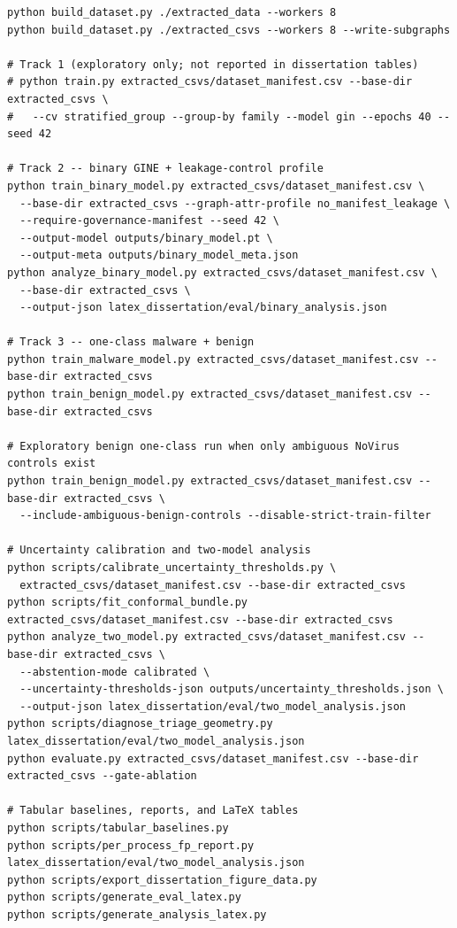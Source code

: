\begin{lstlisting}
python build_dataset.py ./extracted_data --workers 8
python build_dataset.py ./extracted_csvs --workers 8 --write-subgraphs

# Track 1 (exploratory only; not reported in dissertation tables)
# python train.py extracted_csvs/dataset_manifest.csv --base-dir extracted_csvs \
#   --cv stratified_group --group-by family --model gin --epochs 40 --seed 42

# Track 2 -- binary GINE + leakage-control profile
python train_binary_model.py extracted_csvs/dataset_manifest.csv \
  --base-dir extracted_csvs --graph-attr-profile no_manifest_leakage \
  --require-governance-manifest --seed 42 \
  --output-model outputs/binary_model.pt \
  --output-meta outputs/binary_model_meta.json
python analyze_binary_model.py extracted_csvs/dataset_manifest.csv \
  --base-dir extracted_csvs \
  --output-json latex_dissertation/eval/binary_analysis.json

# Track 3 -- one-class malware + benign
python train_malware_model.py extracted_csvs/dataset_manifest.csv --base-dir extracted_csvs
python train_benign_model.py extracted_csvs/dataset_manifest.csv --base-dir extracted_csvs

# Exploratory benign one-class run when only ambiguous NoVirus controls exist
python train_benign_model.py extracted_csvs/dataset_manifest.csv --base-dir extracted_csvs \
  --include-ambiguous-benign-controls --disable-strict-train-filter

# Uncertainty calibration and two-model analysis
python scripts/calibrate_uncertainty_thresholds.py \
  extracted_csvs/dataset_manifest.csv --base-dir extracted_csvs
python scripts/fit_conformal_bundle.py extracted_csvs/dataset_manifest.csv --base-dir extracted_csvs
python analyze_two_model.py extracted_csvs/dataset_manifest.csv --base-dir extracted_csvs \
  --abstention-mode calibrated \
  --uncertainty-thresholds-json outputs/uncertainty_thresholds.json \
  --output-json latex_dissertation/eval/two_model_analysis.json
python scripts/diagnose_triage_geometry.py latex_dissertation/eval/two_model_analysis.json
python evaluate.py extracted_csvs/dataset_manifest.csv --base-dir extracted_csvs --gate-ablation

# Tabular baselines, reports, and LaTeX tables
python scripts/tabular_baselines.py
python scripts/per_process_fp_report.py latex_dissertation/eval/two_model_analysis.json
python scripts/export_dissertation_figure_data.py
python scripts/generate_eval_latex.py
python scripts/generate_analysis_latex.py
\end{lstlisting}

